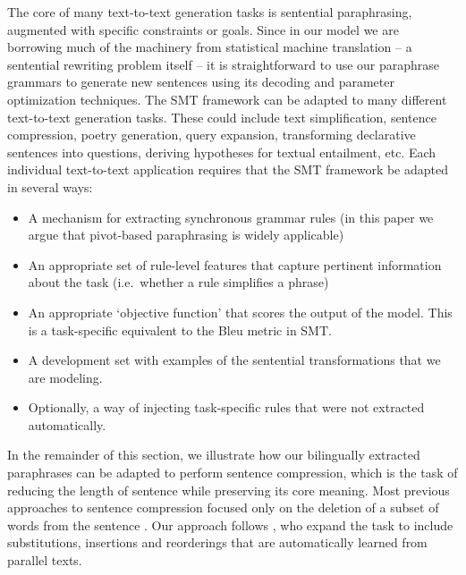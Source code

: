 \documentclass[11pt]{article}
\begin{document}
The core of many text-to-text generation tasks is sentential
paraphrasing, augmented with specific constraints or goals. Since in
our model we are borrowing much of the machinery from statistical
machine translation -- a sentential rewriting problem itself -- it is
straightforward to use our paraphrase grammars to generate new
sentences using its decoding and parameter optimization
techniques. The SMT framework can be adapted to many different
text-to-text generation tasks.  These could include text
simplification, sentence compression, poetry generation, query
expansion, transforming declarative sentences into questions, deriving
hypotheses for textual entailment, etc.  Each individual text-to-text
application requires that the SMT framework be adapted in several
ways:
\begin{itemize}
\item A mechanism for extracting synchronous grammar rules (in this
  paper we argue that pivot-based paraphrasing is widely applicable)
\item An appropriate set of rule-level features that capture pertinent
  information about the task (i.e.\ whether a rule simplifies a
  phrase)
\item An appropriate `objective function' that scores the output of
  the model.  This is a task-specific equivalent to the Bleu metric in
  SMT.
\item A development set with examples of the sentential
  transformations that we are modeling.
\item Optionally, a way of injecting task-specific rules that were not
  extracted automatically.
\end{itemize} 
In the remainder of this section, we illustrate how our bilingually
extracted paraphrases can be adapted to perform sentence compression,
which is the task of reducing the length of sentence while preserving
its core meaning.  Most previous approaches to sentence compression
focused only on the deletion of a subset of words from the sentence
\cite{KnightMarcuAI02}.  Our approach follows
, who expand the task to include
substitutions, insertions and reorderings that are automatically
learned from parallel texts.
\end{document}
